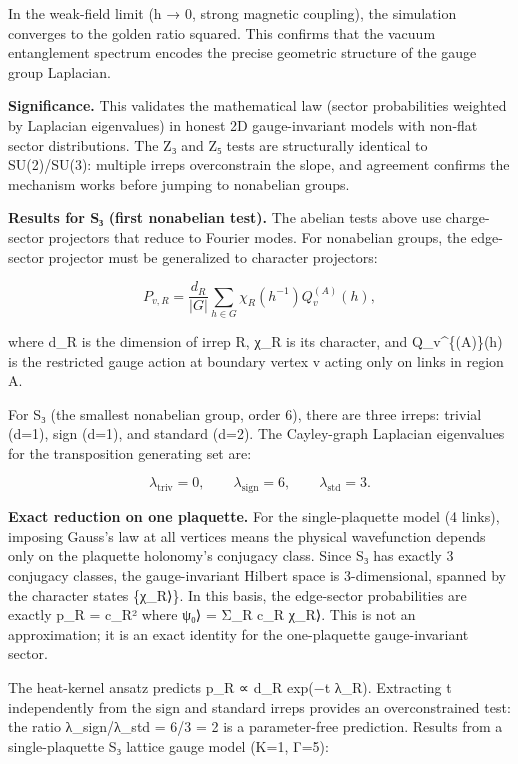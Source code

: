 \documentclass[
]{article}
\begin{document}
In the weak-field limit (h → 0, strong magnetic coupling), the
simulation converges to the golden ratio squared. This confirms that the
vacuum entanglement spectrum encodes the precise geometric structure of
the gauge group Laplacian.

\textbf{Significance.} This validates the mathematical law (sector
probabilities weighted by Laplacian eigenvalues) in honest 2D
gauge-invariant models with non-flat sector distributions. The Z₃ and Z₅
tests are structurally identical to SU(2)/SU(3): multiple irreps
overconstrain the slope, and agreement confirms the mechanism works
before jumping to nonabelian groups.

\textbf{Results for S₃ (first nonabelian test).} The abelian tests above
use charge-sector projectors that reduce to Fourier modes. For
nonabelian groups, the edge-sector projector must be generalized to
character projectors:

\[
P_{v,R} = \frac{d_R}{|G|} \sum_{h \in G} \chi_R(h^{-1}) Q_v^{(A)}(h),
\]

where d\_R is the dimension of irrep R, χ\_R is its character, and
Q\_v\^{}\{(A)\}(h) is the restricted gauge action at boundary vertex v
acting only on links in region A.

For S₃ (the smallest nonabelian group, order 6), there are three irreps:
trivial (d=1), sign (d=1), and standard (d=2). The Cayley-graph
Laplacian eigenvalues for the transposition generating set are:

\[
\lambda_{\mathrm{triv}} = 0, \qquad \lambda_{\mathrm{sign}} = 6, \qquad
\lambda_{\mathrm{std}} = 3.
\]

\textbf{Exact reduction on one plaquette.} For the single-plaquette
model (4 links), imposing Gauss's law at all vertices means the physical
wavefunction depends only on the plaquette holonomy's conjugacy class.
Since S₃ has exactly 3 conjugacy classes, the gauge-invariant Hilbert
space is 3-dimensional, spanned by the character states
\{\textbar χ\_R⟩\}. In this basis, the edge-sector probabilities are
exactly p\_R = \textbar c\_R\textbar² where \textbar ψ₀⟩ = Σ\_R c\_R
\textbar χ\_R⟩. This is not an approximation; it is an exact identity
for the one-plaquette gauge-invariant sector.

The heat-kernel ansatz predicts p\_R ∝ d\_R exp(−t λ\_R). Extracting t
independently from the sign and standard irreps provides an
overconstrained test: the ratio λ\_sign/λ\_std = 6/3 = 2 is a
parameter-free prediction. Results from a single-plaquette S₃ lattice
gauge model (K=1, Γ=5):
\end{document}
